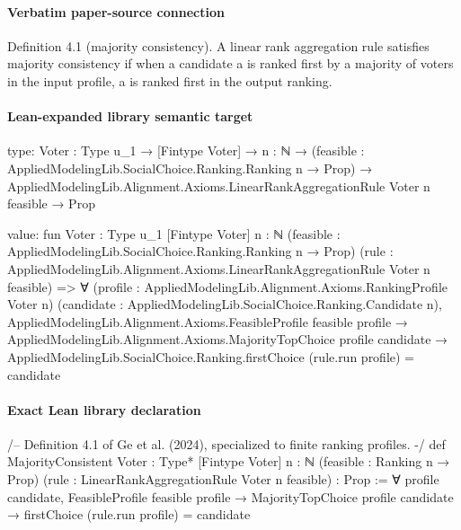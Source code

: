 \documentclass[10pt]{article}
\begin{document}
\paragraph{Verbatim paper-source connection}
\begin{ReviewVerbatim}
Definition 4.1 (majority consistency). A linear rank aggregation rule satisfies majority consistency
if when a candidate a is ranked first by a majority of voters in the input profile, a is ranked first in
the output ranking.
\end{ReviewVerbatim}



\paragraph{Lean-expanded library semantic target}
\begin{ReviewVerbatim}
type:
{Voter : Type u_1} →
  [Fintype Voter] →
    {n : ℕ} →
      (feasible : AppliedModelingLib.SocialChoice.Ranking.Ranking n → Prop) →
        AppliedModelingLib.Alignment.Axioms.LinearRankAggregationRule Voter n feasible → Prop

value:
fun {Voter : Type u_1} [Fintype Voter] {n : ℕ} (feasible : AppliedModelingLib.SocialChoice.Ranking.Ranking n → Prop)
    (rule : AppliedModelingLib.Alignment.Axioms.LinearRankAggregationRule Voter n feasible) =>
  ∀ (profile : AppliedModelingLib.Alignment.Axioms.RankingProfile Voter n)
    (candidate : AppliedModelingLib.SocialChoice.Ranking.Candidate n),
    AppliedModelingLib.Alignment.Axioms.FeasibleProfile feasible profile →
      AppliedModelingLib.Alignment.Axioms.MajorityTopChoice profile candidate →
        AppliedModelingLib.SocialChoice.Ranking.firstChoice (rule.run profile) = candidate
\end{ReviewVerbatim}

\paragraph{Exact Lean library declaration}
\begin{ReviewVerbatim}
/--
Definition 4.1 of Ge et al. (2024), specialized to finite ranking profiles.
-/
def MajorityConsistent {Voter : Type*} [Fintype Voter] {n : ℕ}
    (feasible : Ranking n → Prop)
    (rule : LinearRankAggregationRule Voter n feasible) : Prop :=
  ∀ profile candidate,
    FeasibleProfile feasible profile → MajorityTopChoice profile candidate →
      firstChoice (rule.run profile) = candidate
\end{ReviewVerbatim}
\end{document}
